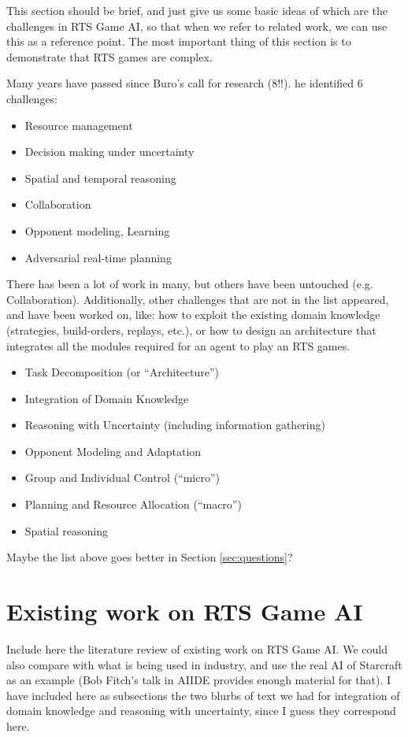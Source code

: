 \documentclass[journal]{IEEEtran}
\begin{document}
{\color{blue}
This section should be brief, and just give us some basic ideas of which are the challenges in RTS Game AI, so that when we refer to related work, we can use this as a reference point.  The most important thing of this section is to demonstrate that RTS games are complex.

Many years have passed since Buro's call for research (8!!). he identified 6 challenges:
\begin{itemize}
\item Resource management
\item Decision making under uncertainty
\item Spatial and temporal reasoning
\item Collaboration
\item Opponent modeling, Learning
\item Adversarial real-time planning
\end{itemize}

There has been a lot of work in many, but others have been untouched (e.g. Collaboration). Additionally, other challenges that are not in the list appeared, and have been worked on, like: how to exploit the existing domain knowledge (strategies, build-orders, replays, etc.), or how to design an architecture that integrates all the modules required for an agent to play an RTS games. 

\begin{itemize}
\item Task Decomposition (or ``Architecture'')
\item Integration of Domain Knowledge
\item Reasoning with Uncertainty (including information gathering)
\item Opponent Modeling and Adaptation
\item Group and Individual Control (``micro'')
\item Planning and Resource Allocation (``macro'')
\item Spatial reasoning
\end{itemize}

Maybe the list above goes better in Section \ref{sec:questions}?
}


\section{Existing work on RTS Game AI}\label{sec:review}

{\color{blue}
Include here the literature review of existing work on RTS Game AI. We could also compare with what is being used in industry, and use the real AI of Starcraft as an example (Bob Fitch's talk in AIIDE provides enough material for that). I have included here as subsections the two blurbs of text we had for integration of domain knowledge and reasoning with uncertainty, since I guess they correspond here.
}
\end{document}
